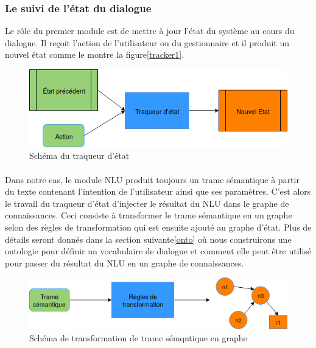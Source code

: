 \subsubsection{Le suivi de l’état du dialogue}
Le rôle du premier module est de mettre à jour l’état du système au cours du dialogue. Il reçoit l’action de l’utilisateur ou du gestionnaire et il produit un nouvel état comme le montre la figure\ref{tracker1}.
\begin{figure}[H] 
	
	\centering
	\includegraphics[width=0.88\linewidth]{images/Conception/DM/Tracker1.png}
	\caption{Schéma du traqueur d'état}
\end{figure}\label{tracker1}
\paragraph{}
Dans notre cas, le module NLU produit toujours un trame sémantique à partir du texte contenant l’intention de l’utilisateur ainsi que ses paramètres. C’est alors le travail du traqueur d’état d’injecter le résultat du NLU dans le graphe de connaissances. Ceci consiste à transformer le trame sémantique en un graphe selon des règles de transformation qui est ensuite ajouté au graphe d’état. Plus de détails seront donnés dans la section suivante\ref{onto} où nous construirons une ontologie pour définir un vocabulaire de dialogue et comment elle peut être utilisé pour passer du résultat du NLU en un graphe de connaissances.
\begin{figure}[H] 
	
	\centering
	\includegraphics[width=0.88\linewidth]{images/Conception/DM/Transformer.png}
	\caption{Schéma de transformation de trame sémqntique en graphe}
\end{figure}\label{transformer}
